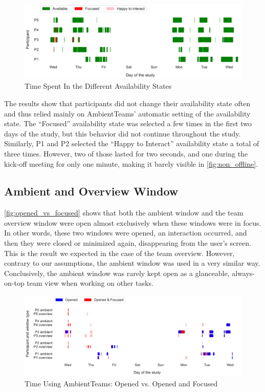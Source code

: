 \begin{figure}[h]
    \centering
    \includegraphics[width=\linewidth]{plots/non_offline.pdf}
    \caption{Time Spent In the Different Availability States}
    \label{fig:non_offline}
\end{figure}

The results show that participants did not change their availability state often and thus relied mainly on AmbientTeams' automatic setting of the availability state. The \enquote{Focused} availability state was selected a few times in the first two days of the study, but this behavior did not continue throughout the study. Similarly, P1 and P2 selected the \enquote{Happy to Interact} availability state a total of three times. However, two of those lasted for two seconds, and one during the kick-off meeting for only one minute, making it barely visible in \autoref{fig:non_offline}.

\subsection{Ambient and Overview Window}
\autoref{fig:opened_vs_focused} shows that both the ambient window and the team overview window were open almost exclusively when these windows were in focus. In other words, these two windows were opened, an interaction occurred, and then they were closed or minimized again, disappearing from the user's screen. This is the result we expected in the case of the team overview. However, contrary to our assumptions, the ambient window was used in a very similar way. Conclusively, the ambient window was rarely kept open as a glanceable, always-on-top team view when working on other tasks.

\begin{figure}[h]
    \centering
    \includegraphics[width=\linewidth]{plots/open_vs_focus.pdf}
    \caption{Time Using AmbientTeams: Opened vs. Opened and Focused}
    \label{fig:opened_vs_focused}
\end{figure}

